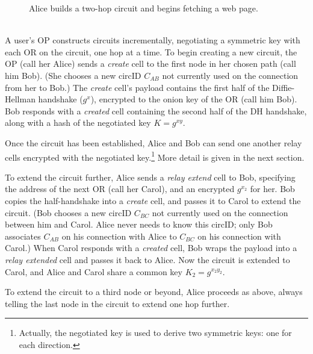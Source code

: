 \documentclass[times,10pt,twocolumn]{article}
\begin{document}
\begin{figure}[h]
\centering
\mbox{}
\caption{Alice builds a two-hop circuit and begins fetching a web page.}
\label{fig:interaction}
\end{figure}

\label{subsubsec:constructing-a-circuit}\\
A user's OP constructs circuits incrementally, negotiating a
symmetric key with each OR on the circuit, one hop at a time. To begin
creating a new circuit, the OP (call her Alice) sends a
\emph{create} cell to the first node in her chosen path (call him Bob).
(She chooses a new
circID $C_{AB}$ not currently used on the connection from her to Bob.)
The \emph{create} cell's
payload contains the first half of the Diffie-Hellman handshake
($g^x$), encrypted to the onion key of the OR (call him Bob). Bob
responds with a \emph{created} cell containing the second half of the
DH handshake, along with a hash of the negotiated key $K=g^{xy}$.

Once the circuit has been established, Alice and Bob can send one
another relay cells encrypted with the negotiated
key.\footnote{Actually, the negotiated key is used to derive two
  symmetric keys: one for each direction.}  More detail is given in
the next section.

To extend the circuit further, Alice sends a \emph{relay extend} cell
to Bob, specifying the address of the next OR (call her Carol), and
an encrypted $g^{x_2}$ for her.  Bob copies the half-handshake into a
\emph{create} cell, and passes it to Carol to extend the circuit.
(Bob chooses a new circID $C_{BC}$ not currently used on the connection
between him and Carol.  Alice never needs to know this circID; only Bob
associates $C_{AB}$ on his connection with Alice to $C_{BC}$ on
his connection with Carol.)
When Carol responds with a \emph{created} cell, Bob wraps the payload
into a \emph{relay extended} cell and passes it back to Alice.  Now
the circuit is extended to Carol, and Alice and Carol share a common key
$K_2 = g^{x_2 y_2}$.

To extend the circuit to a third node or beyond, Alice
proceeds as above, always telling the last node in the circuit to
extend one hop further.
\end{document}
